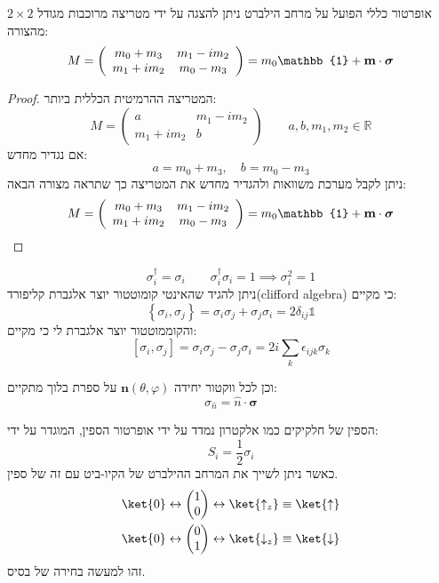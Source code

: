 \documentclass{tstextbook}
\begin{document}
\begin{proposition}
אופרטור כללי הפועל על מרחב הילברט ניתן להצגה על ידי מטריצה מרוכבות מגודל \(2\times 2\) מהצורה:
$$M=\left(\begin{array}{c c}{{m_{0}+m_{3}}}&{{m_{1}-i m_{2}}}\\ {{m_{1}+i m_{2}}}&{{m_{0}-m_{3}}}\end{array}\right)=m_{0}\mathbb{1}+\mathbf{m}\cdot\boldsymbol\sigma$$

\end{proposition}
\begin{proof}
המטריצה ההרמיטית הכללית ביותר:
$$M=\begin{pmatrix}a  & m_{1}-im_{2} \\m_{1}+im_{2} & b
\end{pmatrix}\qquad a,b,m_{1},m_{2} \in \mathbb{R}$$
אם נגדיר מחדש:
$$a=m_{0}+m_{3},\quad b=m_{0}-m_{3}$$
ניתן לקבל מערכת משוואות ולהגדיר מחדש את המטריצה כך שתראה מצורה הבאה:
$$M=\left(\begin{array}{c c}{{m_{0}+m_{3}}}&{{m_{1}-i m_{2}}}\\ {{m_{1}+i m_{2}}}&{{m_{0}-m_{3}}}\end{array}\right)=m_{0}\mathbb{1}+\mathbf{m}\cdot\boldsymbol{\sigma}$$

\end{proof}
\begin{proposition}
$$\sigma_{i}^{\dagger}=\sigma_{i}\qquad \sigma_{i}^{\dagger}\sigma_{i}=1\implies \sigma_{i}^{2}=1$$
ניתן להגיד שהאינטי קומוטטור יוצר אלגברת קליפורד(clifford algebra) כי מקיים:
$$\left\{\sigma_{i},\sigma_{j}\right\}=\sigma_{i}\sigma_{j}+\sigma_{j}\sigma_{i}=2\delta_{i j}\mathbb{1}$$
והקוממוטטור יוצר אלגברת לי כי מקיים:
$$[\sigma_{i},\sigma_{j}]=\sigma_{i}\sigma_{j}-\sigma_{j}\sigma_{i}=2i{\sum_{k}}\epsilon_{i j k}\sigma_{k}$$

\end{proposition}
\begin{definition}
וכן לכל ווקטור יחידה \(\mathbf{n}\left( \theta,\varphi \right)\) על ספרת בלוך מתקיים:
$$\sigma_{\hat{n}}=\hat{n}\cdot \boldsymbol{\sigma}$$

\end{definition}
\begin{definition}
הספין של חלקיקים כמו אלקטרון נמדד על ידי אופרטור הספין, המוגדר על ידי:
$$S_{i}=\frac{1}{2}\sigma_{i}$$
כאשר ניתן לשייך את המרחב ההילברט של הקיו-ביט עם זה של ספין.
\begin{gather*}\ket{ 0} \leftrightarrow  \begin{pmatrix}1 \\ 0\end{pmatrix} \leftrightarrow  \ket{\uparrow _{z}} \equiv \ket{\uparrow }   \\\ket{ 0} \leftrightarrow  \begin{pmatrix}0 \\ 1\end{pmatrix} \leftrightarrow  \ket{\downarrow _{z}} \equiv \ket{\downarrow } 
\end{gather*}
זהו למעשה בחירה של בסיס.

\end{definition}
\end{document}
